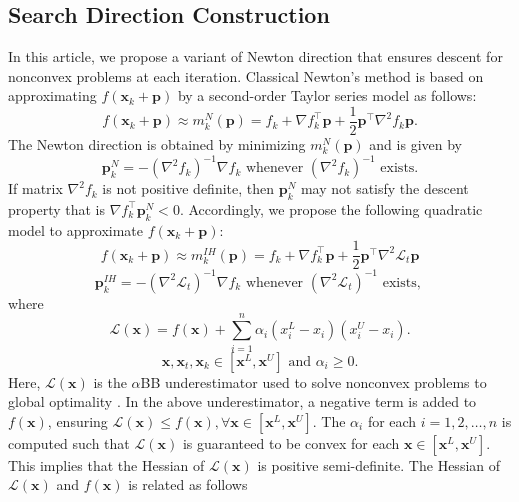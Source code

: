 \documentclass{elsarticle}
\numberwithin{equation}{section}
\begin{document}
\subsection{Search Direction Construction}
\label{sec:SearchDirectionConstruction}
In this article, we propose a variant of Newton direction that ensures descent for nonconvex problems at each iteration. Classical Newton's method is based on approximating $f(\mathbf{x}_k+\mathbf{p})$ by a second-order Taylor series model as follows:
\begin{equation}
    f(\mathbf{x}_k+\mathbf{p}) \approx m_k^N(\mathbf{p}) = f_k + \nabla f^{\top}_k\mathbf{p} + \frac{1}{2}\mathbf{p}^{\top}\nabla^2f_k \mathbf{p}.
\end{equation}
The Newton direction is obtained by minimizing $m_k^N(\mathbf{p})$ and  is given by
\begin{equation}
    \mathbf{p}_k^N = -(\nabla^2 f_k)^{-1}\nabla f_k \text{ whenever } (\nabla^2 f_k)^{-1} \text{ exists}.
\end{equation}
If matrix $\nabla^2 f_k$ is not positive definite, then $\mathbf{p}_k^N$ may not satisfy the descent property that is $\nabla f_k^{\top}\mathbf{p}_k^N < 0$. Accordingly, we propose the following quadratic model to approximate $f(\mathbf{x}_k+\mathbf{p})$:
\begin{equation}
    f(\mathbf{x}_k+\mathbf{p}) \approx m_k^{IH}(\mathbf{p}) = f_k + \nabla f^{\top}_k\mathbf{p} + \frac{1}{2}\mathbf{p}^{\top}\nabla^2\mathcal{L}_t \mathbf{p}
    \label{eq:Modified-Model}
\end{equation}
\begin{equation}
    \mathbf{p}_k^{IH} = -(\nabla^2\mathcal{L}_t)^{-1}\nabla f_k \text{ whenever } (\nabla^2 \mathcal{L}_{t})^{-1} \text{ exists, } 
    \label{eqn:searchdirection}
\end{equation}
where
\begin{equation}
    \mathcal{L}(\mathbf{x}) = f(\mathbf{x}) + \sum_{i=1}^n \alpha_i({x}^L_i - {x}_i)({x}^U_i - {x}_i).
    \label{fig:UnderEstimator}
\end{equation}
\begin{equation*}
    \mathbf{x}, \mathbf{x}_t,\mathbf{x}_k \in [\mathbf{ x}^L,\mathbf{x}^U] \text{ and } \alpha_i \geq 0.
\end{equation*}
Here, $\mathcal{L}(\mathbf{x})$ is the $\alpha$BB underestimator used to solve nonconvex problems to global optimality \cite{adjiman1998global2,androulakis1995alphabb}. In the above underestimator, a negative term is added to $f(\mathbf{x})$, ensuring $\mathcal{L}(\mathbf{x})\leq f(\mathbf{x}), \forall \mathbf{x} \in [\mathbf{x}^L,\mathbf{x}^U]$. The $\alpha_i$ for each $i=1,2,\ldots,n$ is computed such that $\mathcal{L}(\mathbf{x})$ is guaranteed to be convex for each $\mathbf{x} \in [{\mathbf{x}^L},\mathbf{x}^U]$. This implies that the Hessian of $\mathcal{L}(\mathbf{x})$ is positive semi-definite. The Hessian of $\mathcal{L}(\mathbf{x})$ and $f(\mathbf{x})$ is related as follows
\end{document}
